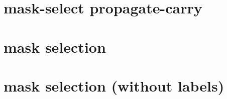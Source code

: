 \documentclass{article}
\begin{document}
\section{mask-select propagate-carry}


\newpage
\section{mask selection}


\newpage
\section{mask selection (without labels)}

\end{document}
